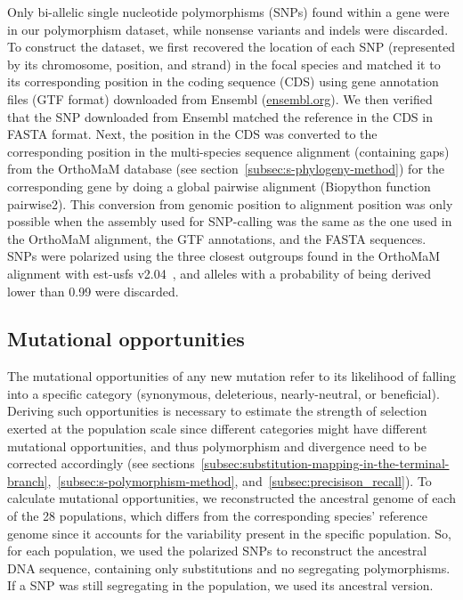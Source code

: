 \documentclass{article}
\begin{document}
    Only bi-allelic single nucleotide polymorphisms (SNPs) found within a gene were in our polymorphism dataset, while nonsense variants and indels were discarded.
    To construct the dataset, we first recovered the location of each SNP (represented by its chromosome, position, and strand) in the focal species and matched it to its corresponding position in the coding sequence (CDS) using gene annotation files (GTF format) downloaded from Ensembl (\url{ensembl.org}).
    We then verified that the SNP downloaded from Ensembl matched the reference in the CDS in FASTA format.
    Next, the position in the CDS was converted to the corresponding position in the multi-species sequence alignment (containing gaps) from the OrthoMaM database (see section~\ref{subsec:s-phylogeny-method}) for the corresponding gene by doing a global pairwise alignment (Biopython function pairwise2).
    This conversion from genomic position to alignment position was only possible when the assembly used for SNP-calling was the same as the one used in the OrthoMaM alignment, the GTF annotations, and the FASTA sequences.
    SNPs were polarized using the three closest outgroups found in the OrthoMaM alignment with est-usfs v2.04~\cite{keightley_inferring_2018}, and alleles with a probability of being derived lower than 0.99 were discarded.

    \subsection{Mutational opportunities}
    \label{subsec:nunber-of-sites}
    The mutational opportunities of any new mutation refer to its likelihood of falling into a specific category (synonymous, deleterious, nearly-neutral, or beneficial).
    Deriving such opportunities is necessary to estimate the strength of selection exerted at the population scale since different categories might have different mutational opportunities, and thus polymorphism and divergence need to be corrected accordingly (see sections~\ref{subsec:substitution-mapping-in-the-terminal-branch},~\ref{subsec:s-polymorphism-method}, and~\ref{subsec:precisison_recall}).
    To calculate mutational opportunities, we reconstructed the ancestral genome of each of the 28 populations, which differs from the corresponding species' reference genome since it accounts for the variability present in the specific population.
    So, for each population, we used the polarized SNPs to reconstruct the ancestral DNA sequence, containing only substitutions and no segregating polymorphisms.
    If a SNP was still segregating in the population, we used its ancestral version.
\end{document}
